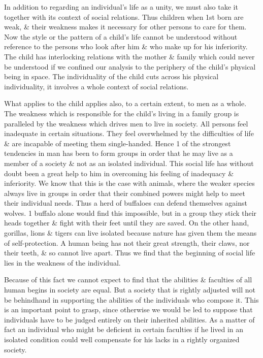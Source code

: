 \documentclass{article}
\begin{document}
In addition to regarding an individual's life as a unity, we must also take it together with its context of social relations. Thus children when 1st born are weak, \& their weakness makes it necessary for other persons to care for them. Now the style or the pattern of a child's life cannot be understood without reference to the persons who look after him \& who make up for his inferiority. The child has interlocking relations with the mother \& family which could never be understood if we confined our analysis to the periphery of the child's physical being in space. The individuality of the child cuts across his physical individuality, it involves a whole context of social relations.

What applies to the child applies also, to a certain extent, to men as a whole. The weakness which is responsible for the child's living in a family group is paralleled by the weakness which drives men to live in society. All persons feel inadequate in certain situations. They feel overwhelmed by the difficulties of life \& are incapable of meeting them single-handed. Hence 1 of the strongest tendencies in man has been to form groups in order that he may live as a member of a society \& not as an isolated individual. This social life has without doubt been a great help to him in overcoming his feeling of inadequacy \& inferiority. We know that this is the case with animals, where the weaker species always live in groups in order that their combined powers might help to meet their individual needs. Thus a herd of buffaloes can defend themselves against wolves. 1 buffalo alone would find this impossible, but in a group they stick their heads together \& fight with their feet until they are saved. On the other hand, gorillas, lions \& tigers can live isolated because nature has given them the means of self-protection. A human being has not their great strength, their claws, nor their teeth, \& so cannot live apart. Thus we find that the beginning of social life lies in the weakness of the individual.

Because of this fact we cannot expect to find that the abilities \& faculties of all human begins in society are equal. But a society that is rightly adjusted will not be behindhand in supporting the abilities of the individuals who compose it. This is an important point to grasp, since otherwise we would be led to suppose that individuals have to be judged entirely on their inherited abilities. As a matter of fact an individual who might be deficient in certain faculties if he lived in an isolated condition could well compensate for his lacks in a rightly organized society.
\end{document}
